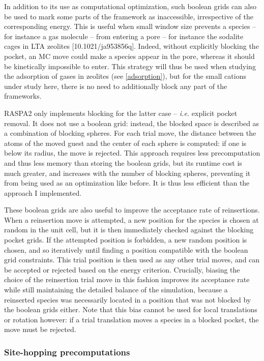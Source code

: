 \documentclass[main.tex]{subfiles}
\begin{document}
In addition to its use as computational optimization, such boolean grids can also be used to mark some parts of the framework as inaccessible, irrespective of the corresponding energy. This is useful when small window size prevents a species -- for instance a gas molecule -- from entering a pore -- for instance the sodalite cages in LTA zeolites [10.1021/ja953856q]. Indeed, without explicitly blocking the pocket, an MC move could make a species appear in the pore, whereas it should be kinetically impossible to enter. This strategy will thus be used when studying the adsorption of gases in zeolites (see \cref{adsorption}), but for the small cations under study here, there is no need to additionally block any part of the frameworks.

RASPA2 only implements blocking for the latter case -- \textit{i.e.} explicit pocket removal. It does not use a boolean grid: instead, the blocked space is described as a combination of blocking spheres. For each trial move, the distance between the atoms of the moved guest and the center of each sphere is computed: if one is below its radius, the move is rejected. This approach requires less precomputation and thus less memory than storing the boolean grids, but its runtime cost is much greater, and increases with the number of blocking spheres, preventing it from being used as an optimization like before. It is thus less efficient than the approach I implemented.

These boolean grids are also useful to improve the acceptance rate of reinsertions. When a reinsertion move is attempted, a new position for the species is chosen at random in the unit cell, but it is then immediately checked against the blocking pocket grids. If the attempted position is forbidden, a new random position is chosen, and so iteratively until finding a position compatible with the boolean grid constraints. This trial position is then used as any other trial moves, and can be accepted or rejected based on the energy criterion. Crucially, biasing the choice of the reinsertion trial move in this fashion improves its acceptance rate while still maintaining the detailed balance of the simulation, because a reinserted species was necessarily located in a position that was not blocked by the boolean grids either. Note that this bias cannot be used for local translations or rotation however: if a trial translation moves a species in a blocked pocket, the move must be rejected.

\subsubsection{Site-hopping precomputations}
\end{document}
